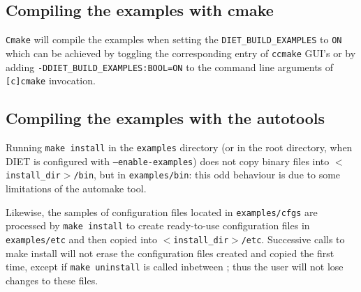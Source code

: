 \subsection{Compiling the examples with cmake}
\verb+Cmake+ will compile the examples when setting the 
\verb+DIET_BUILD_EXAMPLES+ to \verb+ON+ which can be achieved by
toggling the corresponding entry of \verb+ccmake+ GUI's or by adding
\verb+-DDIET_BUILD_EXAMPLES:BOOL=ON+ to the command line
arguments of \verb+[c]cmake+ invocation.

\subsection{Compiling the examples with the autotools}

Running \texttt{make install} in the \texttt{examples} directory (or
in the root directory, when DIET is configured with
\texttt{--enable-examples}) does not copy binary files into
\texttt{$<$install\_dir$>$/bin}, but in \texttt{examples/bin}: this
odd behaviour is due to some limitations of the \textsf{automake} tool.

Likewise, the samples of configuration files located in
\texttt{examples/cfgs} are processed by \texttt{make install} to
create ready-to-use configuration files in \texttt{examples/etc} and
then copied into \texttt{$<$install\_dir$>$/etc}. Successive calls to
make install will not erase the configuration files created and copied
the first time, except if \texttt{make uninstall} is called inbetween
; thus the user will not lose changes to these files.

